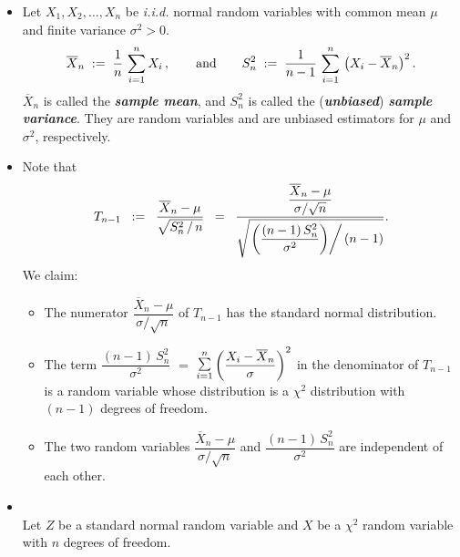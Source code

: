 \documentclass{article}
\begin{document}
\begin{itemize}
\item  Let $X_{1}, X_{2}, \ldots, X_{n}$ be \emph{i.i.d.} normal random variables
          with common mean $\mu$ and finite variance $\sigma^{2} > 0$.
          \begin{equation*}
          \overline{X}_{n} \; := \; \dfrac{1}{n}\,\sum_{i=1}^{n}X_{i}\,,
          \quad\quad\textnormal{and}\quad\quad
          S_{n}^{2} \; := \; \dfrac{1}{n-1}\,\sum_{i=1}^{n}\,\left(X_{i}-\overline{X}_{n}\right)^{2}.
          \end{equation*}
          $\overline{X}_{n}$ is called the \textbf{\emph{sample mean}}, and $S_{n}^{2}$ is called the
          (\textbf{\emph{unbiased}}) \textbf{\emph{sample variance}}.
          They are random variables and are unbiased estimators for $\mu$ and $\sigma^{2}$, respectively.
\item  Note that
          \begin{equation*}
          T_{n-1}
          \;\;:=\;\; \dfrac{\overline{X}_{n} - \mu}{\sqrt{S_{n}^{2}\,/\,n}}
          \;\; =\;\; \dfrac{\dfrac{\overline{X}_{n}-\mu}{\sigma/\sqrt{n}}}
                      {\sqrt{\left.\left(\dfrac{(n-1)\,S_{n}^{2}}{\sigma^{2}}\right)\right/(n-1)}}.
          \end{equation*}
          We claim:
          \begin{itemize}
          \item  The numerator $\dfrac{\overline{X}_{n}-\mu}{\sigma/\sqrt{n}}$ of $T_{n-1}$
                    has the standard normal distribution.
          \item  The term $\dfrac{(n-1)\,S_{n}^{2}}{\sigma^{2}}$ $=$
                    $\underset{i=1}{\overset{n}{\textnormal{\Large$\sum$}}}\left(\dfrac{X_{i}-\overline{X}_{n}}{\sigma}\right)^{2}$
                    in the denominator of $T_{n-1}$
                    is a random variable whose distribution is a $\chi^{2}$ distribution
                    with $(n-1)$ degrees of freedom.
          \item  The two random  variables $\dfrac{\overline{X}_{n}-\mu}{\sigma/\sqrt{n}}$ and
                    $\dfrac{(n-1)\,S_{n}^{2}}{\sigma^{2}}$ are independent of each other.
          \end{itemize}
\item  \begin{definition}\mbox{}\\
          Let $Z$ be a standard normal random variable and
          $X$ be a $\chi^{2}$ random variable with $n$ degrees of freedom.

\end{definition}
\end{itemize}
\end{document}
